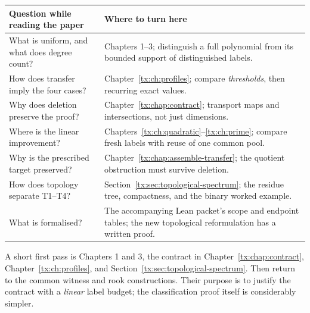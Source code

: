 \begin{center}\small
\begin{tabular}{@{}>{\raggedright\arraybackslash}p{}>{\raggedright\arraybackslash}p{}@{}}
\toprule
Question while reading the paper & Where to turn here\\
\midrule
What is uniform, and what does degree count? & Chapters 1--3; distinguish a full polynomial from its bounded support of distinguished labels.\\[3pt]
How does transfer imply the four cases? & Chapter~\ref{tx:ch:profiles}; compare \emph{thresholds}, then recurring exact values.\\[3pt]
Why does deletion preserve the proof? & Chapter~\ref{tx:chap:contract}; transport maps and intersections, not just dimensions.\\[3pt]
Where is the linear improvement? & Chapters~\ref{tx:ch:quadratic}--\ref{tx:ch:prime}; compare fresh labels with reuse of one common pool.\\[3pt]
Why is the prescribed target preserved? & Chapter~\ref{tx:chap:assemble-transfer}; the quotient obstruction must survive deletion.\\[3pt]
How does topology separate T1--T4? & Section~\ref{tx:sec:topological-spectrum}; the residue tree, compactness, and the binary worked example.\\[3pt]
What is formalised? & The accompanying Lean packet's scope and endpoint tables; the new topological reformulation has a written proof.\\
\bottomrule
\end{tabular}\end{center}

A short first pass is Chapters 1 and 3, the contract in
Chapter~\ref{tx:chap:contract}, Chapter~\ref{tx:ch:profiles}, and
Section~\ref{tx:sec:topological-spectrum}. Then return to the common
witness and rook constructions. Their purpose is to justify the
contract with a \emph{linear} label budget; the classification proof
itself is considerably simpler.

\tableofcontents
\mainmatter
